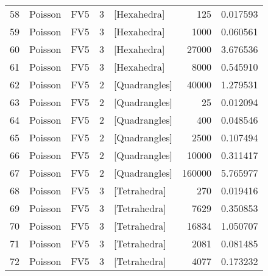 \begin{tabular}{lllrlrr}
58 &   Poisson &                   FV5 &               3 &    [Hexahedra] &                      125 &                         0.017593 \\
59 &   Poisson &                   FV5 &               3 &    [Hexahedra] &                     1000 &                         0.060561 \\
60 &   Poisson &                   FV5 &               3 &    [Hexahedra] &                    27000 &                         3.676536 \\
61 &   Poisson &                   FV5 &               3 &    [Hexahedra] &                     8000 &                         0.545910 \\
62 &   Poisson &                   FV5 &               2 &  [Quadrangles] &                    40000 &                         1.279531 \\
63 &   Poisson &                   FV5 &               2 &  [Quadrangles] &                       25 &                         0.012094 \\
64 &   Poisson &                   FV5 &               2 &  [Quadrangles] &                      400 &                         0.048546 \\
65 &   Poisson &                   FV5 &               2 &  [Quadrangles] &                     2500 &                         0.107494 \\
66 &   Poisson &                   FV5 &               2 &  [Quadrangles] &                    10000 &                         0.311417 \\
67 &   Poisson &                   FV5 &               2 &  [Quadrangles] &                   160000 &                         5.765977 \\
68 &   Poisson &                   FV5 &               3 &   [Tetrahedra] &                      270 &                         0.019416 \\
69 &   Poisson &                   FV5 &               3 &   [Tetrahedra] &                     7629 &                         0.350853 \\
70 &   Poisson &                   FV5 &               3 &   [Tetrahedra] &                    16834 &                         1.050707 \\
71 &   Poisson &                   FV5 &               3 &   [Tetrahedra] &                     2081 &                         0.081485 \\
72 &   Poisson &                   FV5 &               3 &   [Tetrahedra] &                     4077 &                         0.173232 \\
\bottomrule
\end{tabular}

